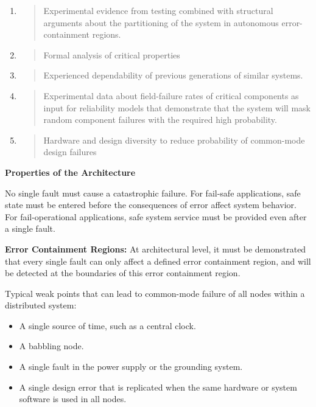 \begin{enumerate}
\def\labelenumi{\arabic{enumi}.}
\item
  \begin{quote}
  Experimental evidence from testing combined with structural arguments
  about the partitioning of the system in autonomous error-containment
  regions.
  \end{quote}
\item
  \begin{quote}
  Formal analysis of critical properties
  \end{quote}
\item
  \begin{quote}
  Experienced dependability of previous generations of similar systems.
  \end{quote}
\item
  \begin{quote}
  Experimental data about field-failure rates of critical components as
  input for reliability models that demonstrate that the system will
  mask random component failures with the required high probability.
  \end{quote}
\item
  \begin{quote}
  Hardware and design diversity to reduce probability of common-mode
  design failures
  \end{quote}
\end{enumerate}

\textbf{Properties of the Architecture}

No single fault must cause a catastrophic failure. For fail-safe
applications, safe state must be entered before the consequences of
error affect system behavior. For fail-operational applications, safe
system service must be provided even after a single fault.

\textbf{Error Containment Regions:} At architectural level, it must be
demonstrated that every single fault can only affect a defined error
containment region, and will be detected at the boundaries of this error
containment region.

Typical weak points that can lead to common-mode failure of all nodes
within a distributed system:

\begin{itemize}
\item
  A single source of time, such as a central clock.
\item
  A babbling node.
\item
  A single fault in the power supply or the grounding system.
\item
  A single design error that is replicated when the same hardware or
  system software is used in all nodes.
\end{itemize}

